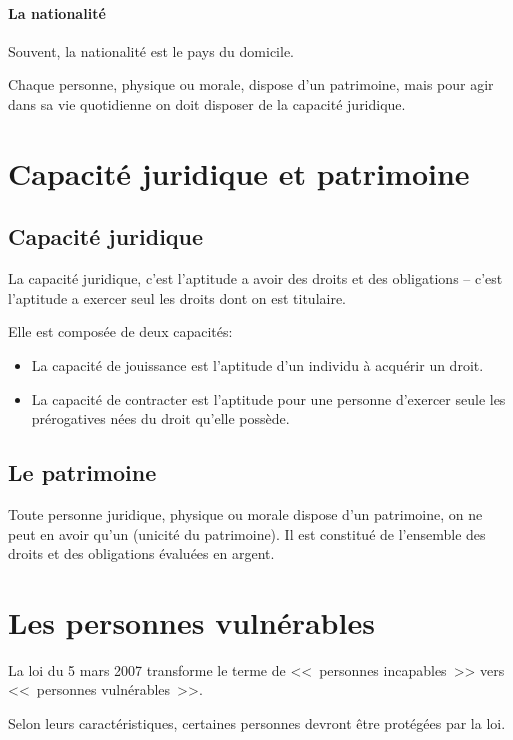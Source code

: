 \documentclass[10pt,a4paper]{article}
\begin{document}
\paragraph{La nationalité}

Souvent, la nationalité est le pays du domicile.

Chaque personne, physique ou morale, dispose d'un patrimoine, mais pour agir dans sa vie quotidienne on doit disposer de la capacité juridique.

\section{Capacité juridique et patrimoine\label{capacité}}

\subsection{Capacité juridique}

La capacité juridique, c'est l'aptitude a avoir des droits et des obligations -- c'est l'aptitude a exercer seul les droits dont on est titulaire.

Elle est composée de deux capacités:
\begin{itemize}
\item La capacité de jouissance est l'aptitude d'un individu à acquérir un droit.

\item La capacité de contracter est l'aptitude pour une personne d'exercer seule les prérogatives nées du droit qu'elle possède.
\end{itemize}

\subsection{Le patrimoine}

Toute personne juridique, physique ou morale dispose d'un patrimoine, on ne peut en avoir qu'un (unicité du patrimoine). Il est constitué de l'ensemble des droits et des obligations évaluées en argent.

\section{Les personnes vulnérables\label{vulnerable}}

La loi du 5 mars 2007 transforme le terme de <<~personnes incapables~>> vers <<~personnes vulnérables~>>.

Selon leurs caractéristiques, certaines personnes devront être protégées par la loi.
\end{document}
